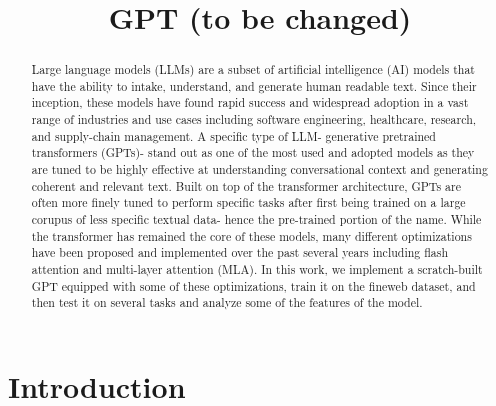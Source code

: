 \documentclass[conference]{IEEEtran}
\begin{document}
\title{GPT (to be changed)}

\author{
\and
{}
\and
{}
\and
{}
\and
{}
\and
{}
}

\maketitle

\begin{abstract}
Large language models (LLMs) are a subset of artificial intelligence (AI)
models that have the ability to intake, understand, and generate human 
readable text. Since their inception, these models have found rapid success and widespread adoption in a vast range of industries and 
use cases including software engineering, healthcare, research, 
and supply-chain management. A specific type of LLM- generative pretrained 
transformers (GPTs)- stand out as one of the most used and adopted models as
they are tuned to be highly effective at understanding conversational 
context and generating coherent and relevant text. Built on top of the transformer architecture, GPTs are often more
finely tuned to perform specific tasks after
first being trained on a large corupus of less specific textual data- hence the pre-trained portion of the name. While the transformer has remained the 
core of these models, many different optimizations have been proposed and 
implemented over the past several years including flash attention and multi-layer attention (MLA). In this work, we implement a scratch-built GPT equipped with some 
of these optimizations, train it on the fineweb dataset, and then test 
it on several tasks and analyze some of the features of the model. 
\end{abstract}


\section{Introduction}

\end{document}
